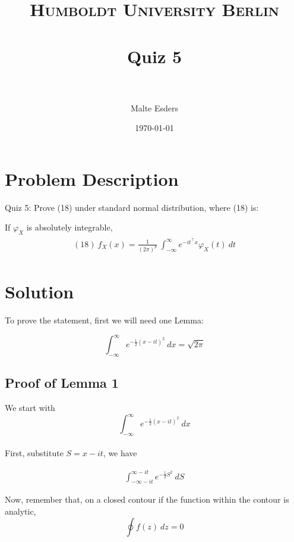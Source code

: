 \documentclass[paper=a4, fontsize=11pt]{scrartcl} %
\title{	
\normalfont \normalsize 
\textsc{Humboldt University Berlin} \\ [25pt] %
\horrule{0.5pt} \\[0.4cm] %
\huge Quiz 5 \\ %
\horrule{2pt} \\[0.5cm] %
}
\author{Malte Esders} %
\date{\normalsize\today} %
\numberwithin{equation}{section} %
\numberwithin{figure}{section} %
\numberwithin{table}{section} %
\begin{document}
\maketitle %

\section{Problem Description}
Quiz 5: Prove (18) under standard normal distribution, where (18) is:

If $\varphi_X$ is absolutely integrable,
\begin{align} 
\begin{split}
	(18)\  f_X(x) = \frac{1}{(2\pi)^p}\ \int_{-\infty}^{\infty}{e^{-it^\intercal x} \varphi_X(t)\ dt}
\end{split}					
\end{align}


\section{Solution}


To prove the statement, first we will need one Lemma:

\begin{equation}
	\int_{-\infty}^{\infty}{e^{-\frac{1}{2}(x-it)^2}\ dx} = \sqrt{2\pi}
\end{equation}

\subsection{Proof of Lemma 1}
We start with
\begin{equation}
	\int_{-\infty}^{\infty}{e^{-\frac{1}{2}(x-it)^2}\ dx}
\end{equation}
\\

First, substitute $S = x-it$, we have

\begin{equation}
\begin{aligned}
	\int_{-\infty-it}^{\infty-it}{e^{-\frac{1}{2}S^2}\ dS}
\end{aligned}
\end{equation}

Now, remember that, on a closed contour if the function within the contour is analytic,
\begin{equation}
	\oint{f(z)\ dz} = 0
\end{equation}
\end{document}
